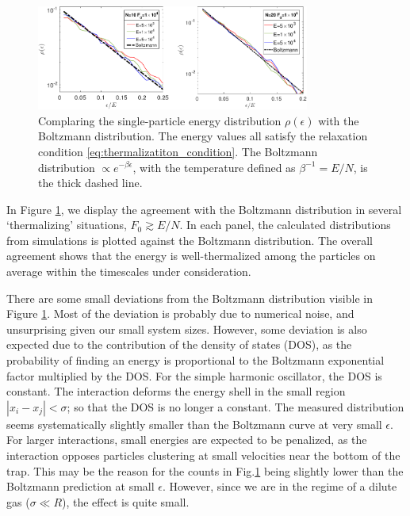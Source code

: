 \documentclass[a4paper, onecolumn]{revtex4-1}
\begin{document}
\begin{figure}[tb]
\includegraphics[width=0.8\textwidth]{Boltzmann_log_2panels_01-crop.pdf}
%
\caption{\label{fig:thermalization9} Complaring the single-particle energy distribution
  $\rho(\epsilon)$ with the Boltzmann distribution.  The energy values all satisfy the relaxation
  condition \eqref{eq:thermalizatiton_condition}.  The Boltzmann distribution $\propto
  e^{-\beta\epsilon}$, with the temperature defined as $\beta^{-1}= E/N$, is the thick dashed line.}
\end{figure}


In Figure \ref{fig:thermalization9}, we display the agreement with the Boltzmann distribution in
several `thermalizing' situations, $F_0\gtrsim E/N$.  In each panel, the calculated distributions
from simulations is plotted against the Boltzmann distribution.  The overall agreement shows that
the energy is well-thermalized among the particles on average within the timescales under
consideration.


There are some small deviations from the Boltzmann distribution visible in Figure
\ref{fig:thermalization9}.  Most of the deviation is probably due to numerical noise, and
unsurprising given our small system sizes.  However, some deviation is also expected due to the
contribution of the density of states (DOS), as the probability of finding an energy is proportional
to the Boltzmann exponential factor multiplied by the DOS.  For the simple harmonic oscillator, the
DOS is constant.  The interaction deforms the energy shell in the small region $|x_i-x_j|<\sigma$;
so that the DOS is no longer a constant.  The measured distribution seems systematically slightly
smaller than the Boltzmann curve at very small $\epsilon$.  For larger interactions, small energies
are expected to be penalized, as the interaction opposes particles clustering at small velocities
near the bottom of the trap.  This may be the reason for the counts in Fig.\ref{fig:thermalization9}
being slightly lower than the Boltzmann prediction at small $\epsilon$.  However, since we are in
the regime of a dilute gas ($\sigma\ll R$), the effect is quite small.
\end{document}
